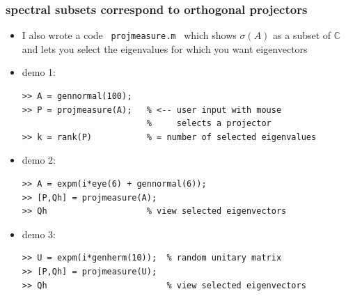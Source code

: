 \documentclass[10pt,hyperref]{beamer}
\newcommand{\CC}{\mathbb{C}}
\begin{document}
\begin{frame}[fragile]
\frametitle{spectral subsets correspond to orthogonal projectors}

\begin{itemize}
\item I also wrote a code \, \texttt{projmeasure.m} \, which shows $\sigma(A)$ as a subset of $\CC$ and lets you select the eigenvalues for which you want eigenvectors
\item demo 1:

\begin{Verbatim}[fontsize=\small]
>> A = gennormal(100);
>> P = projmeasure(A);   % <-- user input with mouse
                         %     selects a projector
>> k = rank(P)           % = number of selected eigenvalues
\end{Verbatim}

\item demo 2:

\begin{Verbatim}[fontsize=\small]
>> A = expm(i*eye(6) + gennormal(6));
>> [P,Qh] = projmeasure(A);
>> Qh                    % view selected eigenvectors
\end{Verbatim}

\item demo 3:

\begin{Verbatim}[fontsize=\small]
>> U = expm(i*genherm(10));  % random unitary matrix
>> [P,Qh] = projmeasure(U);
>> Qh                        % view selected eigenvectors
\end{Verbatim}
\end{itemize}
\end{frame}
\end{document}
